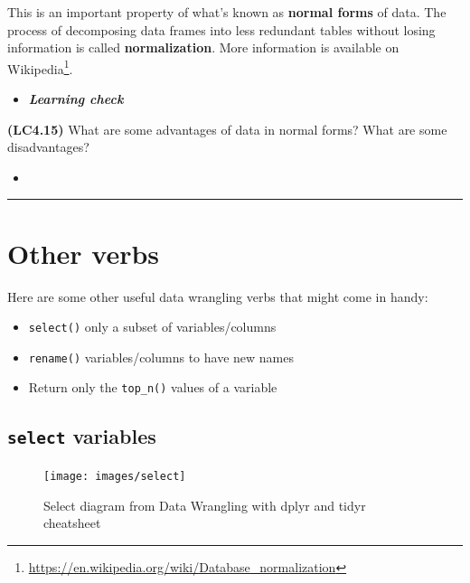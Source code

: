 \documentclass[12pt, krantz2,]{krantz}
\providecommand{\tightlist}{%
  \setlength{\itemsep}{0pt}\setlength{\parskip}{0pt}}
\renewcommand{\href}[2]{#2\footnote{\url{#1}}}
\newenvironment{rmdblock}[1]
  {\begin{shaded*}
  \begin{itemize}
  \renewcommand{\labelitemi}{
    \raisebox{-.7\height}[0pt][0pt]{
    }
  }
  \item
  }
  {
  \end{itemize}
  \end{shaded*}
  }
\newenvironment{learncheck}
  {\begin{rmdblock}{warning}}
  {\end{rmdblock}}
\begin{document}
This is an important property of what's known as \textbf{normal forms} of data. The process of decomposing data frames into less redundant tables without losing information is called \textbf{normalization}. More information is available on \href{https://en.wikipedia.org/wiki/Database_normalization}{Wikipedia}.

\begin{learncheck}
\textbf{\emph{Learning check}}
\end{learncheck}

\textbf{(LC4.15)} What are some advantages of data in normal forms? What are some disadvantages?

\begin{learncheck}

\end{learncheck}

\begin{center}\rule{0.5\linewidth}{\linethickness}\end{center}

\hypertarget{other-verbs}{%
\section{Other verbs}\label{other-verbs}}

Here are some other useful data wrangling verbs that might come in handy:

\begin{itemize}
\tightlist
\item
  \texttt{select()} only a subset of variables/columns
\item
  \texttt{rename()} variables/columns to have new names
\item
  Return only the \texttt{top\_n()} values of a variable
\end{itemize}

\hypertarget{select}{%
\subsection{\texorpdfstring{\texttt{select} variables}{select variables}}\label{select}}

\begin{figure}

{\centering \texttt{[image: images/select]} 

}

\caption{Select diagram from Data Wrangling with dplyr and tidyr cheatsheet}\label{fig:selectfig}
\end{figure}
\end{document}
